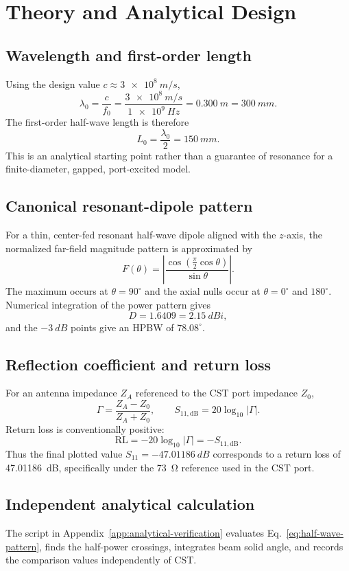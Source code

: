 \section{Theory and Analytical Design}

\subsection{Wavelength and first-order length}
Using the design value $c\approx\SI{3e8}{m/s}$,
\begin{equation}
\lambda_0=\frac{c}{f_0}
=\frac{\SI{3e8}{m/s}}{\SI{1e9}{Hz}}
=\SI{0.300}{m}=\SI{300}{mm}.
\label{eq:wavelength}
\end{equation}
The first-order half-wave length is therefore
\begin{equation}
L_0=\frac{\lambda_0}{2}=\SI{150}{mm}.
\label{eq:halfwave-length}
\end{equation}
This is an analytical starting point rather than a guarantee of resonance for a
finite-diameter, gapped, port-excited model.

\subsection{Canonical resonant-dipole pattern}
For a thin, center-fed resonant half-wave dipole aligned with the $z$-axis, the normalized
far-field magnitude pattern is approximated by~\cite{stutzman2012}
\begin{equation}
F(\theta)=\left|
\frac{\cos\!\left(\frac{\pi}{2}\cos\theta\right)}{\sin\theta}
\right|.
\label{eq:half-wave-pattern}
\end{equation}
The maximum occurs at $\theta=90^\circ$ and the axial nulls occur at
$\theta=0^\circ$ and $180^\circ$. Numerical integration of the power pattern gives
\begin{equation}
D=1.6409=\SI{2.15}{dBi},
\end{equation}
and the $-\SI{3}{dB}$ points give an HPBW of $78.08^\circ$.

\subsection{Reflection coefficient and return loss}
For an antenna impedance $Z_A$ referenced to the CST port impedance $Z_0$,
\begin{equation}
\Gamma=\frac{Z_A-Z_0}{Z_A+Z_0},
\qquad
S_{11,\mathrm{dB}}=20\log_{10}|\Gamma|.
\label{eq:s11}
\end{equation}
Return loss is conventionally positive:
\begin{equation}
\mathrm{RL}=-20\log_{10}|\Gamma|=-S_{11,\mathrm{dB}}.
\label{eq:return-loss}
\end{equation}
Thus the final plotted value $S_{11}=-\SI{47.01186}{dB}$ corresponds to a return
loss of \SI{47.01186}{dB}, specifically under the \SI{73}{\ohm} reference used in the
CST port.

\subsection{Independent analytical calculation}
The script in Appendix~\ref{app:analytical-verification} evaluates
Eq.~\eqref{eq:half-wave-pattern}, finds the half-power crossings, integrates beam solid
angle, and records the comparison values independently of CST.
